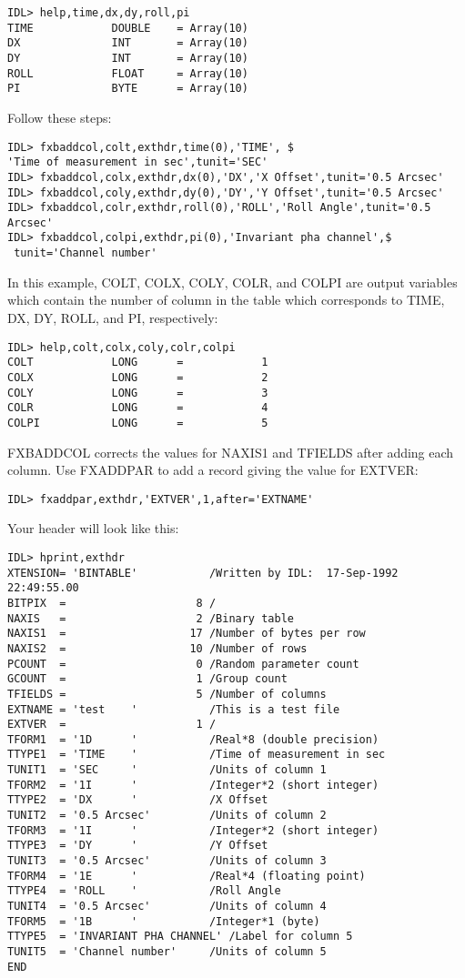 \medskip\noindent
\begin{verbatim}
IDL> help,time,dx,dy,roll,pi
TIME            DOUBLE    = Array(10)
DX              INT       = Array(10)
DY              INT       = Array(10)
ROLL            FLOAT     = Array(10)
PI              BYTE      = Array(10)
\end{verbatim}
Follow these steps:

\medskip\noindent
\begin{verbatim}
IDL> fxbaddcol,colt,exthdr,time(0),'TIME', $
'Time of measurement in sec',tunit='SEC'
IDL> fxbaddcol,colx,exthdr,dx(0),'DX','X Offset',tunit='0.5 Arcsec'
IDL> fxbaddcol,coly,exthdr,dy(0),'DY','Y Offset',tunit='0.5 Arcsec'
IDL> fxbaddcol,colr,exthdr,roll(0),'ROLL','Roll Angle',tunit='0.5 Arcsec'
IDL> fxbaddcol,colpi,exthdr,pi(0),'Invariant pha channel',$
 tunit='Channel number'
\end{verbatim}
In this example, COLT, COLX, COLY, COLR, and COLPI are output variables
which contain the number of column in the table which corresponds to
TIME, DX, DY, ROLL, and PI, respectively:

\medskip\noindent
\begin{verbatim}
IDL> help,colt,colx,coly,colr,colpi
COLT            LONG      =            1
COLX            LONG      =            2
COLY            LONG      =            3
COLR            LONG      =            4
COLPI           LONG      =            5
\end{verbatim}
FXBADDCOL corrects the values for NAXIS1 and TFIELDS after adding each
column. Use FXADDPAR to add a record giving the value for EXTVER:

\medskip\noindent
\begin{verbatim}
IDL> fxaddpar,exthdr,'EXTVER',1,after='EXTNAME'
\end{verbatim}
Your header will look like this:

\medskip\noindent
\begin{verbatim}
IDL> hprint,exthdr
XTENSION= 'BINTABLE'           /Written by IDL:  17-Sep-1992 22:49:55.00
BITPIX  =                    8 /
NAXIS   =                    2 /Binary table
NAXIS1  =                   17 /Number of bytes per row
NAXIS2  =                   10 /Number of rows
PCOUNT  =                    0 /Random parameter count
GCOUNT  =                    1 /Group count
TFIELDS =                    5 /Number of columns
EXTNAME = 'test    '           /This is a test file
EXTVER  =                    1 /
TFORM1  = '1D      '           /Real*8 (double precision)
TTYPE1  = 'TIME    '           /Time of measurement in sec
TUNIT1  = 'SEC     '           /Units of column 1
TFORM2  = '1I      '           /Integer*2 (short integer)
TTYPE2  = 'DX      '           /X Offset
TUNIT2  = '0.5 Arcsec'         /Units of column 2
TFORM3  = '1I      '           /Integer*2 (short integer)
TTYPE3  = 'DY      '           /Y Offset
TUNIT3  = '0.5 Arcsec'         /Units of column 3
TFORM4  = '1E      '           /Real*4 (floating point)
TTYPE4  = 'ROLL    '           /Roll Angle
TUNIT4  = '0.5 Arcsec'         /Units of column 4
TFORM5  = '1B      '           /Integer*1 (byte)
TTYPE5  = 'INVARIANT PHA CHANNEL' /Label for column 5
TUNIT5  = 'Channel number'     /Units of column 5
END
\end{verbatim}
 

